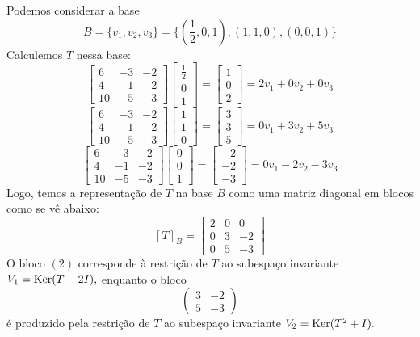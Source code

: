 \documentclass[11pt,a4paper]{article}
\begin{document}
{{Podemos considerar a base
\[
B = \{ v_1, v_2, v_3 \} = \{ (\frac{1}{2}, 0, 1), (1,1,0), (0,0,1) \}
\]
Calculemos $T$ nessa base:
\[
\begin{bmatrix}
6 & -3 & -2 \\ 4 & -1 & -2 \\ 10 & -5 & -3 
\end{bmatrix} \begin{bmatrix}
\frac{1}{2} \\ 0 \\ 1
\end{bmatrix} = \begin{bmatrix}
1 \\ 0 \\ 2
\end{bmatrix} = 2v_1 + 0v_2  + 0v_3
\]
\[
\begin{bmatrix}
6 & -3 & -2 \\ 4 & -1 & -2 \\ 10 & -5 & -3 
\end{bmatrix} \begin{bmatrix}
1 \\ 1 \\ 0
\end{bmatrix} = \begin{bmatrix}
3 \\ 3 \\ 5
\end{bmatrix} = 0v_1 + 3v_2 + 5v_3
\]
\[
\begin{bmatrix}
6 & -3 & -2 \\ 4 & -1 & -2 \\ 10 & -5 & -3 
\end{bmatrix} \begin{bmatrix}
0 \\ 0 \\ 1
\end{bmatrix} = \begin{bmatrix}
-2 \\ -2 \\ -3
\end{bmatrix} = 0v_1 - 2v_2 - 3v_3
\]
Logo, temos a representação de $T$ na base $B$ como uma matriz diagonal em blocos como se vê abaixo:
\[
[T]_B = \left[\begin{array}{c|cc}
2 & 0 & 0 \\ \hline
0 & 3 & -2 \\
0 & 5 & -3
\end{array}\right]
\]
O bloco $(2)$ corresponde à restrição de $T$ ao subespaço invariante $V_1 = \operatorname{Ker}(T - 2I),$ enquanto o bloco
\[
\begin{pmatrix}
3 & -2 \\
5 & -3
\end{pmatrix}
\]
é produzido pela restrição de $T$ ao subespaço invariante $V_2 = \operatorname{Ker}(T^2 + I).$
}
}
\end{document}
